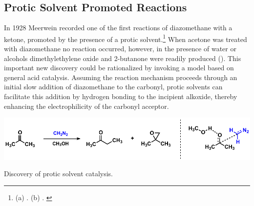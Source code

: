 \subsection{Protic Solvent Promoted Reactions}
In 1928 Meerwein recorded one of the first reactions of
diazomethane with a ketone, promoted by the presence of a protic solvent.\footnote{(a)
. (b) .
\label{ref:meerwein}} When acetone was treated with diazomethane no reaction
occurred, however, in the presence of water or alcohols dimethylethylene oxide
and 2-butanone were readily produced (). This important new
discovery could be rationalized by invoking a model based on general acid catalysis. Assuming the
reaction mechanism proceeds through an initial slow addition of diazomethane to the carbonyl, protic
solvents can facilitate this addition by hydrogen bonding to the incipient alkoxide, thereby
enhancing the electrophilicity of the carbonyl acceptor.
\begin{Scheme}[t]
  \centering
  \includegraphics[scale=0.8]{chp_diazobkg/images/meerwein}
  \caption{Discovery of protic solvent catalysis.}
  \label{sch:meerwein}
\end{Scheme}

